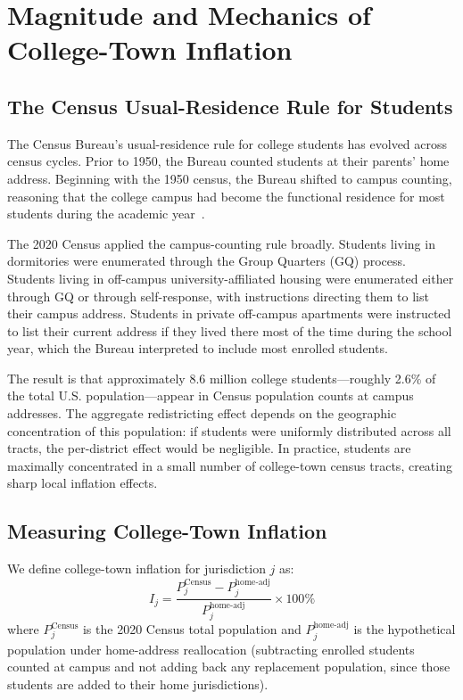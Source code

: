 \section{Magnitude and Mechanics of College-Town Inflation}
\label{sec:magnitude}

\subsection{The Census Usual-Residence Rule for Students}

The Census Bureau's usual-residence rule for college students has evolved across census cycles. Prior to 1950, the Bureau counted students at their parents' home address. Beginning with the 1950 census, the Bureau shifted to campus counting, reasoning that the college campus had become the functional residence for most students during the academic year~\citep{census2021residence}.

The 2020 Census applied the campus-counting rule broadly. Students living in dormitories were enumerated through the Group Quarters (GQ) process. Students living in off-campus university-affiliated housing were enumerated either through GQ or through self-response, with instructions directing them to list their campus address. Students in private off-campus apartments were instructed to list their current address if they lived there most of the time during the school year, which the Bureau interpreted to include most enrolled students.

The result is that approximately 8.6 million college students---roughly 2.6\% of the total U.S. population---appear in Census population counts at campus addresses. The aggregate redistricting effect depends on the geographic concentration of this population: if students were uniformly distributed across all tracts, the per-district effect would be negligible. In practice, students are maximally concentrated in a small number of college-town census tracts, creating sharp local inflation effects.

\subsection{Measuring College-Town Inflation}

We define college-town inflation for jurisdiction $j$ as:
\[
I_j = \frac{P_j^{\text{Census}} - P_j^{\text{home-adj}}}{P_j^{\text{home-adj}}} \times 100\%
\]
where $P_j^{\text{Census}}$ is the 2020 Census total population and $P_j^{\text{home-adj}}$ is the hypothetical population under home-address reallocation (subtracting enrolled students counted at campus and not adding back any replacement population, since those students are added to their home jurisdictions).

